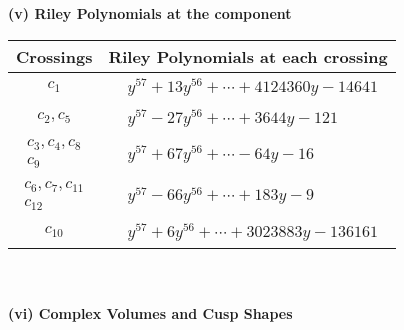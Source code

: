\documentclass[1p]{elsarticle_modified}
\theoremstyle{definition}
\begin{document}
\newpage\renewcommand{\arraystretch}{1}
\flushleft \textbf{(v) Riley Polynomials at the component}\newline \\
\begin{tabular}{m{50pt}|m{274pt}}
Crossings & \hspace{64pt}Riley Polynomials at each crossing \\
\hline $$\begin{aligned}c_{1}\end{aligned}$$&$\begin{aligned}
&y^{57}+13 y^{56}+\cdots+4124360 y-14641
\end{aligned}$\\
\hline $$\begin{aligned}c_{2},c_{5}\end{aligned}$$&$\begin{aligned}
&y^{57}-27 y^{56}+\cdots+3644 y-121
\end{aligned}$\\
\hline $$\begin{aligned}c_{3},c_{4},c_{8}\\c_{9}\end{aligned}$$&$\begin{aligned}
&y^{57}+67 y^{56}+\cdots-64 y-16
\end{aligned}$\\
\hline $$\begin{aligned}c_{6},c_{7},c_{11}\\c_{12}\end{aligned}$$&$\begin{aligned}
&y^{57}-66 y^{56}+\cdots+183 y-9
\end{aligned}$\\
\hline $$\begin{aligned}c_{10}\end{aligned}$$&$\begin{aligned}
&y^{57}+6 y^{56}+\cdots+3023883 y-136161
\end{aligned}$\\
\hline
\end{tabular}\\~\\
\newpage\flushleft \textbf{(vi) Complex Volumes and Cusp Shapes}
\end{document}

